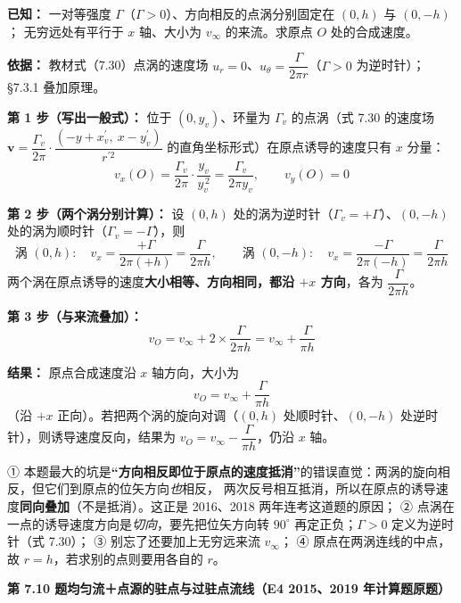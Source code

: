 \begin{jie}
\textbf{已知：} 一对等强度 $\Gamma$（$\Gamma>0$）、方向相反的点涡分别固定在 $(0,h)$ 与 $(0,-h)$；
无穷远处有平行于 $x$ 轴、大小为 $v_\infty$ 的来流。求原点 $O$ 处的合成速度。

\textbf{依据：} 教材式（7.30）点涡的速度场 $u_r=0$、$u_\theta=\dfrac{\Gamma}{2\pi r}$（$\Gamma>0$ 为逆时针）；
\S7.3.1 叠加原理。

\textbf{第 1 步（写出一般式）：}
位于 $(0,y_v)$、环量为 $\Gamma_v$ 的点涡（式 7.30 的速度场
$\bm v=\dfrac{\Gamma_v}{2\pi}\cdot\dfrac{(-y+x_v^{\prime},\ x-y_v^{\prime})}{r^{\prime 2}}$ 的直角坐标形式）在原点诱导的速度只有 $x$ 分量：
\[
v_x(O)=\frac{\Gamma_v}{2\pi}\cdot\frac{y_v}{y_v^{\,2}}=\frac{\Gamma_v}{2\pi y_v},\qquad v_y(O)=0
\]

\textbf{第 2 步（两个涡分别计算）：} 设 $(0,h)$ 处的涡为逆时针（$\Gamma_v=+\Gamma$）、$(0,-h)$ 处的涡为顺时针（$\Gamma_v=-\Gamma$），则
\[
\text{涡 }(0,h):\quad v_x=\frac{+\Gamma}{2\pi(+h)}=\frac{\Gamma}{2\pi h},\qquad
\text{涡 }(0,-h):\quad v_x=\frac{-\Gamma}{2\pi(-h)}=\frac{\Gamma}{2\pi h}
\]
两个涡在原点诱导的速度\textbf{大小相等、方向相同，都沿 $+x$ 方向}，各为 $\dfrac{\Gamma}{2\pi h}$。

\textbf{第 3 步（与来流叠加）：}
\[
v_O=v_\infty+2\times\frac{\Gamma}{2\pi h}=v_\infty+\frac{\Gamma}{\pi h}
\]

\textbf{结果：} 原点合成速度沿 $x$ 轴方向，大小为
\[
\boxed{\,v_O=v_\infty+\frac{\Gamma}{\pi h}\,}
\]
（沿 $+x$ 正向）。若把两个涡的旋向对调（$(0,h)$ 处顺时针、$(0,-h)$ 处逆时针），则诱导速度反向，结果为 $v_O=v_\infty-\dfrac{\Gamma}{\pi h}$，仍沿 $x$ 轴。
\end{jie}

\begin{yicuo}
① 本题最大的坑是\textbf{“方向相反即位于原点的速度抵消”}的错误直觉：两涡的旋向相反，但它们到原点的位矢方向\emph{也}相反，
两次反号相互抵消，所以在原点的诱导速度\textbf{同向叠加}（不是抵消）。这正是 2016、2018 两年连考这道题的原因；
② 点涡在一点的诱导速度方向是\emph{切向}，要先把位矢方向转 $90^\circ$ 再定正负；$\Gamma>0$ 定义为逆时针（式 7.30）；
③ 别忘了还要加上无穷远来流 $v_\infty$；
④ 原点在两涡连线的中点，故 $r=h$，若求别的点则要用各自的 $r$。
\end{yicuo}

\noindent\textbf{第 7.10 题\quad 均匀流＋点源的驻点与过驻点流线（E4 2015、2019 年计算题原题）}

